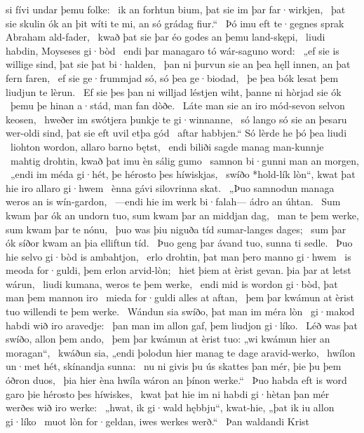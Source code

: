 si fívi undar þemu folke: \hld\ ik an forhtun bium,
þat sie im þar far·wirkjen, \hld\ þat sie skulin ók an þit wíti te mi,
an só grádag fiur.“ \hld\ Þó imu eft te·gegnes sprak
Abraham ald-fader, \hld\ kwað þat sie þar éo godes
an þemu land-skępi, \hld\ liudi habdin,
Moyseses gi·bòd \hld\ endi þar managaro tó
wár-saguno word: \hld\ „ef sie is willige sind,
þat sie þat bi·halden, \hld\ þan ni þurvun sie an þea hęll innen,
an þat fern faren, \hld\ ef sie ge·frummjad só,
só þea ge·biodad, \hld\ þe þea bók lesat
þem liudjun te lèrun. \hld\ Ef sie þes þan ni willjad léstjen wiht,
þanne ni hòrjad sie ók \hld\ þemu þe hinan a·stád,
man fan dòðe. \hld\ Láte man sie an iro mód-sevon
selvon keosen, \hld\ hweðer im swótjera þunkje
te gi·winnanne, \hld\ só lango só sie an þesaru wer-oldi sind,
þat sie eft uvil etþa gód \hld\ aftar habbjen.“
Só lèrde he þó þea liudi \hld\ liohton wordon,
allaro barno bętst, \hld\ endi biliði sagde
manag man-kunnje \hld\ mahtig drohtin,
kwað þat imu èn sálig gumo \hld\ samnon bi·gunni
man an morgen, \hld\ „endi im méda gi·hét,
þe hérosto þes híwiskjas, \hld\ swíðo *hold-lík lòn“,
kwat þat hie iro allaro gi·hwem \hld\ ènna gávi
silovrinna skat. \hld\ „Þuo samnodun managa
weros an is wín-gardon, \hld\ —endi hie im werk bi·falah—
ádro an úhtan. \hld\ Sum kwam þar ók an undorn tuo,
sum kwam þar an middjan dag, \hld\ man te þem werke,
sum kwam þar te nónu, \hld\ þuo was þiu niguða tíd
sumar-langes dages; \hld\ sum þar ók síðor kwam
an þia elliftun tíd. \hld\ Þuo geng þar ávand tuo,
sunna ti sedle. \hld\ Þuo hie selvo gi·bòd
is ambahtjon, \hld\ erlo drohtin,
þat man þero manno gi·hwem \hld\ is meoda for·guldi,
þem erlon arvid-lòn; \hld\ hiet þiem at èrist gevan.
þia þar at letst wárun, \hld\ liudi kumana,
weros te þem werke, \hld\ endi mid is wordon gi·bòd,
þat man þem mannon iro \hld\ mieda for·guldi
alles at aftan, \hld\ þem þar kwámun at èrist tuo
willendi te þem werke. \hld\ Wándun sia swíðo,
þat man im méra lòn \hld\ gi·makod habdi
wið iro aravedje: \hld\ þan man im allon gaf,
þem liudjon gi·líko. \hld\ Léð was þat swíðo,
allon þem ando, \hld\ þem þar kwámun at èrist tuo:
„wi kwámun hier an moragan“, \hld\ kwáðun sia, „endi þolodun hier manag te dage
aravid-werko, \hld\ hwílon un·met hét,
skínandja sunna: \hld\ nu ni givis þu ús skattes þan mér,
þie þu þem óðron duos, \hld\ þia hier èna hwíla
wáron an þínon werke.“ \hld\ Þuo habda eft is word garo
þie hérosto þes híwiskes, \hld\ kwat þat hie im ni habdi gi·hètan þan mér
werðes wið iro werke: \hld\ „hwat, ik gi·wald hębbju“, kwat-hie,
„þat ik iu allon gi·líko \hld\ muot lòn for·geldan,
iwes werkes werð.“ \hld\ Þan waldandi Krist
